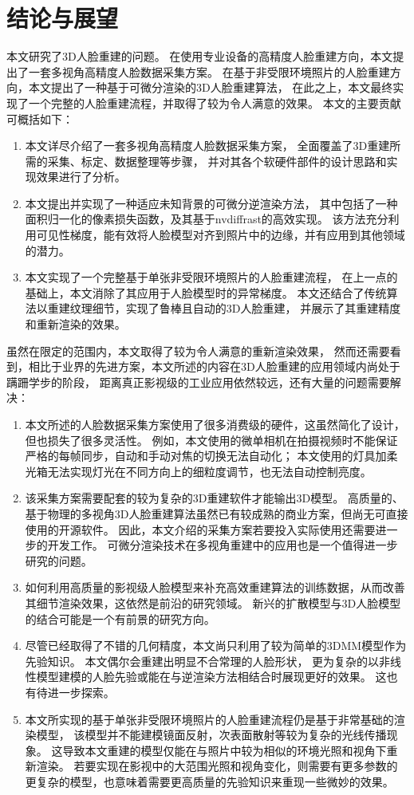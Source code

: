 \documentclass{scutmaster}
\begin{document}
{
\backmatter
\chapter{结论与展望}
\label{chap:conclusion}

本文研究了3D人脸重建的问题。
在使用专业设备的高精度人脸重建方向，本文提出了一套多视角高精度人脸数据采集方案。
在基于非受限环境照片的人脸重建方向，本文提出了一种基于可微分渲染的3D人脸重建算法，
在此之上，本文最终实现了一个完整的人脸重建流程，并取得了较为令人满意的效果。
本文的主要贡献可概括如下：
\begin{enumerate}
\item 本文详尽介绍了一套多视角高精度人脸数据采集方案，
全面覆盖了3D重建所需的采集、标定、数据整理等步骤，
并对其各个软硬件部件的设计思路和实现效果进行了分析。
\item 本文提出并实现了一种适应未知背景的可微分逆渲染方法，
其中包括了一种面积归一化的像素损失函数，及其基于nvdiffrast的高效实现。
该方法充分利用可见性梯度，能有效将人脸模型对齐到照片中的边缘，并有应用到其他领域的潜力。
\item 本文实现了一个完整基于单张非受限环境照片的人脸重建流程，
在上一点的基础上，本文消除了其应用于人脸模型时的异常梯度。
本文还结合了传统算法以重建纹理细节，实现了鲁棒且自动的3D人脸重建，
并展示了其重建精度和重新渲染的效果。
\end{enumerate}

虽然在限定的范围内，本文取得了较为令人满意的重新渲染效果，
然而还需要看到，相比于业界的先进方案，本文所述的内容在3D人脸重建的应用领域内尚处于蹒跚学步的阶段，
距离真正影视级的工业应用依然较远，还有大量的问题需要解决：
\begin{enumerate}
\item 本文所述的人脸数据采集方案使用了很多消费级的硬件，这虽然简化了设计，但也损失了很多灵活性。
例如，本文使用的微单相机在拍摄视频时不能保证严格的每帧同步，自动和手动对焦的切换无法自动化；
本文使用的灯具加柔光箱无法实现灯光在不同方向上的细粒度调节，也无法自动控制亮度。
\item 该采集方案需要配套的较为复杂的3D重建软件才能输出3D模型。
高质量的、基于物理的多视角3D人脸重建算法虽然已有较成熟的商业方案，但尚无可直接使用的开源软件。
因此，本文介绍的采集方案若要投入实际使用还需要进一步的开发工作。
可微分渲染技术在多视角重建中的应用也是一个值得进一步研究的问题。
\item 如何利用高质量的影视级人脸模型来补充高效重建算法的训练数据，从而改善其细节渲染效果，这依然是前沿的研究领域。
新兴的扩散模型与3D人脸模型的结合可能是一个有前景的研究方向。
\item 尽管已经取得了不错的几何精度，本文尚只利用了较为简单的3DMM模型作为先验知识。
本文偶尔会重建出明显不合常理的人脸形状，
更为复杂的以非线性模型建模的人脸先验或能在与逆渲染方法相结合时展现更好的效果。
这也有待进一步探索。
\item 本文所实现的基于单张非受限环境照片的人脸重建流程仍是基于非常基础的渲染模型，
该模型并不能建模镜面反射，次表面散射等较为复杂的光线传播现象。
这导致本文重建的模型仅能在与照片中较为相似的环境光照和视角下重新渲染。
若要实现在影视中的大范围光照和视角变化，则需要有更多参数的更复杂的模型，也意味着需要更高质量的先验知识来重现一些微妙的效果。
\end{enumerate}

}
\end{document}
